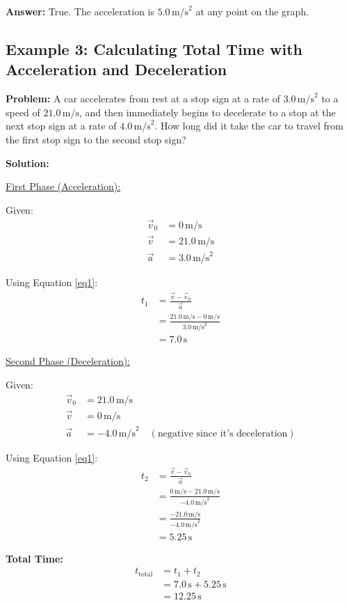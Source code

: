 \documentclass{article}
\begin{document}
\textbf{Answer:} True. The acceleration is \( 5.0 \, \text{m/s}^2 \) at any point on the graph.
\newpage
\subsection{Example 3: Calculating Total Time with Acceleration and Deceleration}

\textbf{Problem:} A car accelerates from rest at a stop sign at a rate of \( 3.0 \, \text{m/s}^2 \) to a speed of \( 21.0 \, \text{m/s} \), and then immediately begins to decelerate to a stop at the next stop sign at a rate of \( 4.0 \, \text{m/s}^2 \). How long did it take the car to travel from the first stop sign to the second stop sign?

\textbf{Solution:}

\underline{First Phase (Acceleration):}

Given:
\begin{align*}
\vec{v}_0 &= 0 \, \text{m/s} \\
\vec{v} &= 21.0 \, \text{m/s} \\
\vec{a} &= 3.0 \, \text{m/s}^2
\end{align*}

Using Equation \eqref{eq1}:
\begin{align*}
t_1 &= \frac{\vec{v} - \vec{v}_0}{\vec{a}} \\
&= \frac{21.0 \, \text{m/s} - 0 \, \text{m/s}}{3.0 \, \text{m/s}^2} \\
&= 7.0 \, \text{s}
\end{align*}

\underline{Second Phase (Deceleration):}

Given:
\begin{align*}
\vec{v}_0 &= 21.0 \, \text{m/s} \\
\vec{v} &= 0 \, \text{m/s} \\
\vec{a} &= -4.0 \, \text{m/s}^2 \quad (\text{negative since it's deceleration})
\end{align*}

Using Equation \eqref{eq1}:
\begin{align*}
t_2 &= \frac{\vec{v} - \vec{v}_0}{\vec{a}} \\
&= \frac{0 \, \text{m/s} - 21.0 \, \text{m/s}}{ -4.0 \, \text{m/s}^2} \\
&= \frac{-21.0 \, \text{m/s}}{ -4.0 \, \text{m/s}^2} \\
&= 5.25 \, \text{s}
\end{align*}

\textbf{Total Time:}
\begin{align*}
t_{\text{total}} &= t_1 + t_2 \\
&= 7.0 \, \text{s} + 5.25 \, \text{s} \\
&= 12.25 \, \text{s}
\end{align*}
\end{document}
